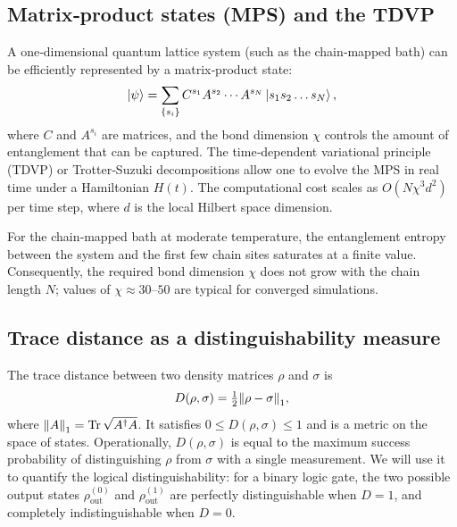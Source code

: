 \documentclass[11pt,a4paper]{article}
\theoremstyle{definition}
\theoremstyle{remark}
\begin{document}
\subsection{Matrix‑product states (MPS) and the TDVP}\label{sec:MPS}
A one‑dimensional quantum lattice system (such as the chain‑mapped bath) can be efficiently represented by a matrix‑product state:
\begin{equation}
\ket{\psi} = \sum_{\{s_i\}} C^{s_1} A^{s_2} \cdots A^{s_N} \ket{s_1 s_2 \dots s_N},
\end{equation}
where $C$ and $A^{s_i}$ are matrices, and the bond dimension $\chi$ controls the amount of entanglement that can be captured. The time‑dependent variational principle (TDVP) or Trotter‑Suzuki decompositions allow one to evolve the MPS in real time under a Hamiltonian $H(t)$. The computational cost scales as $O(N\chi^3 d^2)$ per time step, where $d$ is the local Hilbert space dimension.

For the chain‑mapped bath at moderate temperature, the entanglement entropy between the system and the first few chain sites saturates at a finite value. Consequently, the required bond dimension $\chi$ does not grow with the chain length $N$; values of $\chi\approx 30$–$50$ are typical for converged simulations.

\subsection{Trace distance as a distinguishability measure}\label{sec:trace}
The trace distance between two density matrices $\rho$ and $\sigma$ is
\begin{equation}
D(\rho,\sigma) = \tfrac12 \norm{\rho-\sigma}_1,
\end{equation}
where $\norm{A}_1=\Tr\sqrt{A^\dagger A}$. It satisfies $0\le D(\rho,\sigma)\le 1$ and is a metric on the space of states. Operationally, $D(\rho,\sigma)$ is equal to the maximum success probability of distinguishing $\rho$ from $\sigma$ with a single measurement. We will use it to quantify the logical distinguishability: for a binary logic gate, the two possible output states $\rho_{\text{out}}^{(0)}$ and $\rho_{\text{out}}^{(1)}$ are perfectly distinguishable when $D=1$, and completely indistinguishable when $D=0$.
\end{document}
